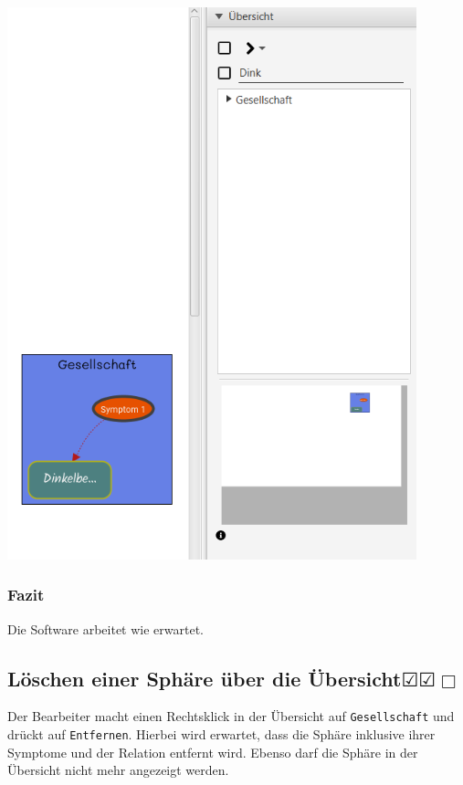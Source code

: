 \documentclass[enabledeprecatedfontcommands]{scrartcl}
\newcommand{\subsectiont}[2]{\subsection[#1]{#1{\normalsize\normalfont #2}}}
\newcommand{\leer}{$\Box$}
\newcommand{\ok}{$\CheckedBox$}
\begin{document}
\begin{center}
\includegraphics[height=16cm]{farbeSymptomUebersichtNachher.PNG}
\end{center}
\subsubsection{Fazit}
Die Software arbeitet wie erwartet.

\subsectiont{Löschen einer Sphäre über die Übersicht}{\dotfill\ok\ok\leer}
Der Bearbeiter macht einen Rechtsklick in der Übersicht auf \texttt{Gesellschaft} und drückt auf \texttt{Entfernen}. Hierbei wird erwartet, dass die Sphäre inklusive ihrer Symptome und der Relation entfernt wird. Ebenso darf die Sphäre in der Übersicht nicht mehr angezeigt werden. 
\end{document}
